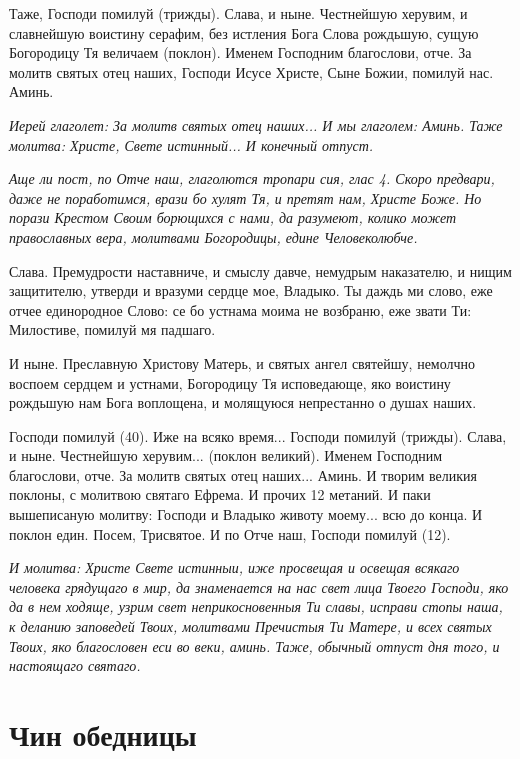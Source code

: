 Таже, Господи помилуй (трижды). Слава, и ныне. Честнейшую херувим, и славнейшую воистину серафим, без истления Бога Слова рождьшую, сущую Богородицу Тя величаем (поклон). Именем Господним благослови, отче. За молитв святых отец наших, Господи Исусе Христе, Сыне Божии, помилуй нас. Аминь.


\itshape Иерей глаголет:\normalfont{} За молитв святых отец наших... И мы глаголем: Аминь. Таже молитва: Христе, Свете истинный... И конечный отпуст.


\itshape Аще ли пост, по Отче наш, глаголются тропари сия, глас 4.\normalfont{} Скоро предвари, даже не поработимся, врази бо хулят Тя, и претят нам, Христе Боже. Но порази Крестом Своим борющихся с нами, да разумеют, колико может православных вера, молитвами Богородицы, едине Человеколюбче.

Слава. Премудрости наставниче, и смыслу давче, немудрым наказателю, и нищим защитителю, утверди и вразуми сердце мое, Владыко. Ты даждь ми слово, еже отчее единородное Слово: се бо устнама моима не возбраню, еже звати Ти: Милостиве, помилуй мя падшаго.

И ныне. Преславную Христову Матерь, и святых ангел святейшу, немолчно воспоем сердцем и устнами, Богородицу Тя исповедающе, яко воистину рождьшую нам Бога воплощена, и молящуюся непрестанно о душах наших. 

Господи помилуй (40). Иже на всяко время... Господи помилуй (трижды). Слава, и ныне. Честнейшую херувим... (поклон великий). Именем Господним благослови, отче. За молитв святых отец наших... Аминь. И творим великия поклоны, с молитвою святаго Ефрема. И прочих 12 метаний. И паки вышеписаную молитву: Господи и Владыко животу моему... всю до конца. И поклон един. Посем, Трисвятое. И по Отче наш, Господи помилуй (12).


\itshape И молитва:\normalfont{} Христе Свете истинныи, иже просвещая и освещая всякаго человека грядущаго в мир, да знаменается на нас свет лица Твоего Господи, яко да в нем ходяще, узрим свет неприкосновенныя Ти славы, исправи стопы наша, к деланию заповедей Твоих, молитвами Пречистыя Ти Матере, и всех святых Твоих, яко благословен еси во веки, аминь. Таже, обычный отпуст дня того, и настоящаго святаго.


\section{Чин обедницы}
 


